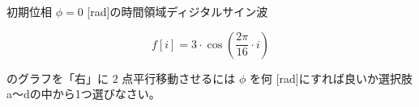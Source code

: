 初期位相 $\phi = 0$ [rad]の時間領域ディジタルサイン波 

\[
f[i] = 3 \cdot \cos \left ( \frac{2 \pi}{16}  \cdot i \right )
\]

\noindent のグラフを「右」に $2$ 点平行移動させるには $\phi$ を何 [rad]にすれば良いか選択肢a〜dの中から1つ選びなさい。
